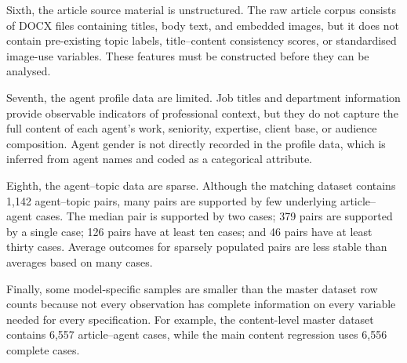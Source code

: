 Sixth, the article source material is unstructured. The raw article corpus consists of DOCX files containing titles, body text, and embedded images, but it does not contain pre-existing topic labels, title–content consistency scores, or standardised image-use variables. These features must be constructed before they can be analysed.

Seventh, the agent profile data are limited. Job titles and department information provide observable indicators of professional context, but they do not capture the full content of each agent's work, seniority, expertise, client base, or audience composition. Agent gender is not directly recorded in the profile data, which is inferred from agent names and coded as a categorical attribute.

Eighth, the agent–topic data are sparse. Although the matching dataset contains 1,142 agent–topic pairs, many pairs are supported by few underlying article–agent cases. The median pair is supported by two cases; 379 pairs are supported by a single case; 126 pairs have at least ten cases; and 46 pairs have at least thirty cases. Average outcomes for sparsely populated pairs are less stable than averages based on many cases.

Finally, some model-specific samples are smaller than the master dataset row counts because not every observation has complete information on every variable needed for every specification. For example, the content-level master dataset contains 6,557 article–agent cases, while the main content regression uses 6,556 complete cases.
